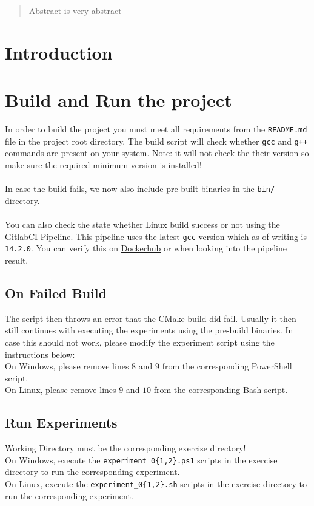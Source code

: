 \documentclass[twocolumn]{article}
\begin{document}


\begin{abstract}
    Abstract is very abstract
\end{abstract}


\section{Introduction}

\section{Build and Run the project}

In order to build the project you must meet all requirements from the \texttt{README.md} file in the project root directory.
The build script will check whether \texttt{gcc} and \texttt{g++} commands are present on your system. 
Note: it will not check the their version so make sure the required minimum version is installed!\\
\\
In case the build fails, we now also include pre-built binaries in the \texttt{bin/} directory.\\
\\
You can also check the state whether Linux build success or not using the \href{https://gitlab.inf.uni-konstanz.de/ag-storandt/ae-24/koston.schwitz/-/pipelines}{GitlabCI Pipeline}. 
This pipeline uses the latest \texttt{gcc} version which as of writing is \texttt{14.2.0}. 
You can verify this on \href{https://hub.docker.com/_/gcc}{Dockerhub} or when looking into the pipeline result.

\subsection{On Failed Build}
The script then throws an error that the CMake build did fail.
Usually it then still continues with executing the experiments using the pre-build binaries.
In case this should not work, please modify the experiment script using the instructions below:\\
On Windows, please remove lines $8$ and $9$ from the corresponding PowerShell script.\\
On Linux, please remove lines $9$ and $10$ from the corresponding Bash script.

\subsection{Run Experiments}
Working Directory must be the corresponding exercise directory!\\
On Windows, execute the \texttt{experiment\_0\{1,2\}.ps1} scripts in the exercise directory to run the corresponding experiment.\\
On Linux, execute the \texttt{experiment\_0\{1,2\}.sh} scripts in the exercise directory to run the corresponding experiment.\\
\end{document}
